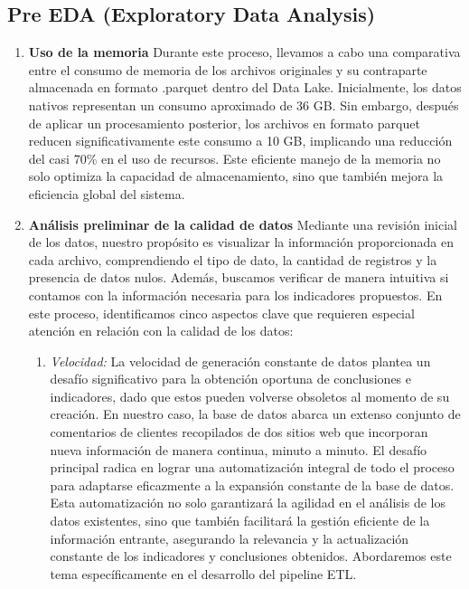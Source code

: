 \documentclass[12pt]{article}
\begin{document}
\subsection{Pre EDA (Exploratory Data Analysis)}
\begin{enumerate}
    \item \textbf{Uso de la memoria}
    Durante este proceso, llevamos a cabo una comparativa entre el consumo de memoria de los archivos originales y su contraparte almacenada en formato .parquet dentro del Data Lake. Inicialmente, los datos nativos representan un consumo aproximado de 36 GB. Sin embargo, después de aplicar un procesamiento posterior, los archivos en formato parquet reducen significativamente este consumo a 10 GB, implicando una reducción del casi 70\% en el uso de recursos. Este eficiente manejo de la memoria no solo optimiza la capacidad de almacenamiento, sino que también mejora la eficiencia global del sistema.

    \item \textbf{Análisis preliminar de la calidad de datos}
    Mediante una revisión inicial de los datos, nuestro propósito es visualizar la información proporcionada en cada archivo, comprendiendo el tipo de dato, la cantidad de registros y la presencia de datos nulos. Además, buscamos verificar de manera intuitiva si contamos con la información necesaria para los indicadores propuestos. En este proceso, identificamos cinco aspectos clave que requieren especial atención en relación con la calidad de los datos:

    \begin{enumerate}
        \item \textit{Velocidad:} La velocidad de generación constante de datos plantea un desafío significativo para la obtención oportuna de conclusiones e indicadores, dado que estos pueden volverse obsoletos al momento de su creación. En nuestro caso, la base de datos abarca un extenso conjunto de comentarios de clientes recopilados de dos sitios web que incorporan nueva información de manera continua, minuto a minuto. El desafío principal radica en lograr una automatización integral de todo el proceso para adaptarse eficazmente a la expansión constante de la base de datos. Esta automatización no solo garantizará la agilidad en el análisis de los datos existentes, sino que también facilitará la gestión eficiente de la información entrante, asegurando la relevancia y la actualización constante de los indicadores y conclusiones obtenidos. Abordaremos este tema específicamente en el desarrollo del pipeline ETL.


\end{enumerate}
\end{enumerate}
\end{document}

